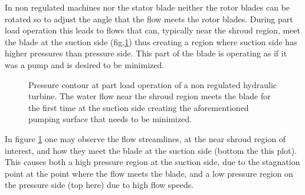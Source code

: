 In non regulated machines nor the stator blade neither the rotor blades can be rotated so to adjust the angle that the flow meets the rotor blades. During part load operation this leads to flows that can, typically near the shroud region, meet the blade at the suction side (fig.\ref{design-pumpS}) thus creating a region where suction side has higher pressures than pressure side. This part of the blade is operating as if it was a pump and is desired to be minimized. 

\begin{figure}[h!]
\begin{minipage}[b]{1\linewidth}
 \centering
\end{minipage}
\caption{Pressure contour at part load operation of a non regulated hydraulic turbine. The water flow near the shroud region meets the blade for the first time at the suction side creating the aforementioned pumping surface that needs to be minimized. }
\label{design-pumpS}
\end{figure}

In figure \ref{design-pumpS} one may observe the flow streamlines, at the near shroud region of interest, and how they meet the blade at the suction side (bottom the this plot). This causes both a high pressure region at the suction side, due to the stagnation point at the point where the flow meets the blade,  and a low pressure region on the pressure side (top here) due to high flow speeds.        

